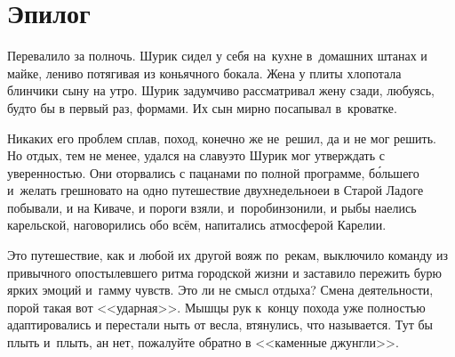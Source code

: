 
{
\cleardoublepage



\fancyhead[LE]{\fancyplain{}{}}
\fancyhead[RO]{\fancyplain{}{}}

\section*{Эпилог}


Перевалило за полночь. Шурик сидел у себя на~кухне в~домашних штанах и майке, лениво потягивая из коньячного бокала. Жена у плиты хлопотала блинчики сыну на утро. Шурик задумчиво рассматривал жену сзади, любуясь, будто бы в первый раз, формами. Их сын мирно посапывал в~кроватке. 

Никаких его проблем сплав, поход, конечно же не~решил, да и не мог решить. Но отдых, тем не менее, удался на славу\mdash это Шурик мог утверждать с уверенностью. Они оторвались с пацанами по полной программе, б\'{о}льшего и~желать грешновато на одно путешествие двухнедельное\mdash и в Старой Ладоге побывали, и на Киваче, и пороги взяли, и~поробинзонили, и рыбы наелись карельской, наговорились обо всём, напитались атмосферой Карелии.

Это путешествие, как и любой их другой вояж по~рекам, выключило команду из привычного опостылевшего ритма городской жизни и заставило пережить бурю ярких эмоций и~гамму чувств. Это ли не смысл отдыха? Смена деятельности, порой такая вот <<ударная>>. Мышцы рук к~концу похода уже полностью адаптировались и перестали ныть от весла, втянулись, что называется. Тут бы плыть и~плыть, ан нет, пожалуйте обратно в <<каменные джунгли>>.

}
